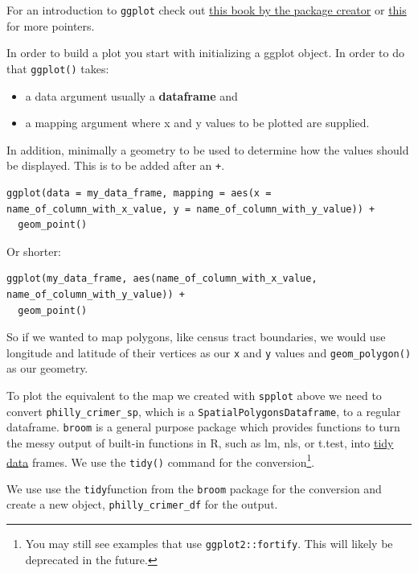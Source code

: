 \documentclass[]{book}
\providecommand{\tightlist}{%
  \setlength{\itemsep}{0pt}\setlength{\parskip}{0pt}}
\let\rmarkdownfootnote\footnote%
\def\footnote{\protect\rmarkdownfootnote}
\theoremstyle{definition}
\theoremstyle{definition}
\theoremstyle{definition}
\theoremstyle{remark}
\begin{document}
For an introduction to \texttt{ggplot} check out
\href{http://link.springer.com/book/10.1007\%2F978-3-319-24277-4}{this
book by the package creator} or
\href{http://ggplot2.tidyverse.org/}{this} for more pointers.

In order to build a plot you start with initializing a ggplot object. In
order to do that \texttt{ggplot()} takes:

\begin{itemize}
\tightlist
\item
  a data argument usually a \textbf{dataframe} and
\item
  a mapping argument where x and y values to be plotted are supplied.
\end{itemize}

In addition, minimally a geometry to be used to determine how the values
should be displayed. This is to be added after an \texttt{+}.

\begin{verbatim}
ggplot(data = my_data_frame, mapping = aes(x = name_of_column_with_x_value, y = name_of_column_with_y_value)) +
  geom_point()
\end{verbatim}

Or shorter:

\begin{verbatim}
ggplot(my_data_frame, aes(name_of_column_with_x_value, name_of_column_with_y_value)) +
  geom_point()
\end{verbatim}

So if we wanted to map polygons, like census tract boundaries, we would
use longitude and latitude of their vertices as our \texttt{x} and
\texttt{y} values and \texttt{geom\_polygon()} as our geometry.

To plot the equivalent to the map we created with \texttt{spplot} above
we need to convert \texttt{philly\_crimer\_sp}, which is a
\texttt{SpatialPolygonsDataframe}, to a regular dataframe.
\texttt{broom} is a general purpose package which provides functions to
turn the messy output of built-in functions in R, such as lm, nls, or
t.test, into \href{https://www.jstatsoft.org/article/view/v059i10}{tidy
data} frames. We use the \texttt{tidy()} command for the
conversion\footnote{You may still see examples that use
  \texttt{ggplot2::fortify}. This will likely be deprecated in the
  future.}.

We use use the \texttt{tidy}function from the \texttt{broom} package for
the conversion and create a new object, \texttt{philly\_crimer\_df} for
the output.
\end{document}
